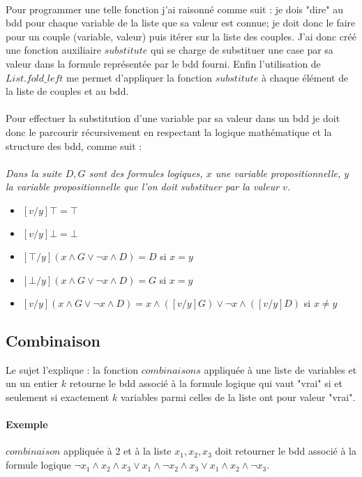 \documentclass{report}
\begin{document}
	\paragraph{}
	Pour programmer une telle fonction j'ai raisonné comme suit : je dois "dire" au bdd pour chaque variable de la liste que sa valeur est connue; je doit donc le faire pour un couple (variable, valeur) puis itérer sur la liste des couples.
	J'ai donc créé une fonction auxiliaire $substitute$ qui se charge de substituer une case par sa valeur dans la formule représentée par le bdd fourni.
	Enfin l'utilisation de $List.fold\_left$ me permet d'appliquer la fonction $substitute$ à chaque élément de la liste de couples et au bdd.
	\paragraph{}
	Pour effectuer la substitution d'une variable par sa valeur dans un bdd je doit donc le parcourir récursivement en respectant la logique mathématique et la structure des bdd, comme suit :
	\paragraph{}
\itshape Dans la suite $D, G$ sont des formules logiques, $x$ une variable propositionnelle, $y$ la variable propositionnelle que l'on doit substituer par la valeur $v$.\upshape

	\begin{itemize}
		\item $[v/y] \top = \top$
		\item $[v/y] \bot = \bot$
		\item $[\top /y] (x \wedge G \vee \neg x \wedge D) = D$ si $x = y$
		\item $[\bot /y] (x \wedge G \vee \neg x \wedge D) = G$ si $x = y$
		\item $[v/y] (x \wedge G \vee \neg x \wedge D) = x \wedge ([v/y] G) \vee \neg x \wedge ([v/y] D)$ si $x \neq y$
	\end{itemize}
	
	\subsection{Combinaison}
	Le sujet l'explique : la fonction $combinaisons$ appliquée à une liste de variables et un un entier $k$ retourne le bdd associé à la formule logique qui vaut "vrai" si et seulement si exactement $k$ variables parmi celles de la liste ont pour valeur "vrai".
	\paragraph{Exemple}
	$combinaison$ appliquée à 2 et à la liste $x_1, x_2, x_3$ doit retourner le bdd associé à la formule logique $ \neg x_1 \wedge x_2 \wedge x_3 \vee x_1 \wedge \neg x_2 \wedge x_3 \vee x_1 \wedge x_2 \wedge \neg x_3$.
\end{document}
